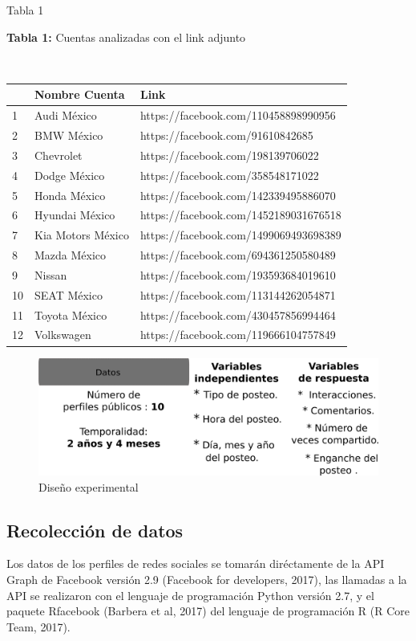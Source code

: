 \documentclass[a4paper,10pt]{article}
\begin{document}
\begin{center}
Tabla 1
\caption{\textbf{Tabla 1:} Cuentas analizadas con el link adjunto } \\[0.3cm] 
{\footnotesize
   \begin{tabular} {l|l|l} 
    \hline
    & Nombre Cuenta & Link \\ 
    \hline
    1 & Audi México & https://facebook.com/110458898990956 \\
    2 & BMW México & https://facebook.com/91610842685 \\
    3 & Chevrolet & https://facebook.com/198139706022 \\
    4 & Dodge México & https://facebook.com/358548171022 \\
    5 & Honda México & https://facebook.com/142339495886070 \\
    6 & Hyundai México & https://facebook.com/1452189031676518  \\
    7 & Kia Motors México & https://facebook.com/1499069493698389 \\
    8 & Mazda México &  https://facebook.com/694361250580489 \\
    9 & Nissan &  https://facebook.com/193593684019610 \\
    10 & SEAT México & https://facebook.com/113144262054871 \\
    11 & Toyota México & https://facebook.com/430457856994464 \\
    12 & Volkswagen & https://facebook.com/119666104757849 \\
    \hline
    \end{tabular}
}
\end{center}





\begin{figure}[H]
  \begin{center}
   \includegraphics[width=.75\textwidth]{imagenes/figura1.png}
   \caption{Diseño experimental}
  \end{center} 
\end{figure}

\subsection{Recolección de datos}
Los datos de los perfiles de redes sociales se tomarán diréctamente de la API Graph de Facebook 
versión 2.9 (Facebook for developers, 2017), las llamadas a la API se realizaron con el lenguaje de programación Python versión 2.7, 
y el paquete Rfacebook (Barbera et al, 2017) del lenguaje de programación R (R Core Team, 2017).
\end{document}
